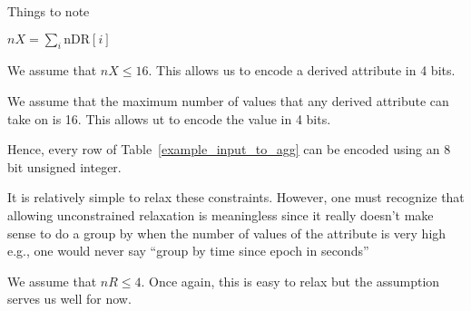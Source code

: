 Things to note
\bi
\item \(nX = \sum_i \mathrm{nDR}[i]\)
\item We assume that \(nX \leq 16\). This allows us to encode a derived
attribute in 4 bits. 
\item We assume that the maximum number of values that any derived attribute can
take on is 16. This allows ut to encode the value in 4 bits.
\item Hence, every row of Table~\ref{example_input_to_agg} can be encoded using
an 8 bit unsigned integer.
\item It is relatively simple to relax these constraints. However, one must
recognize that allowing unconstrained relaxation is meaningless since it really
doesn't make sense to do a group by when the number of values of the attribute
is very high e.g., one would never say ``group by time since epoch in seconds''
\item We assume that \(nR \leq 4\). Once again, this is easy to relax but the
assumption serves us well for now.
\ei



 
